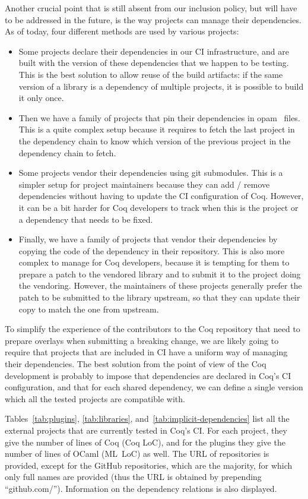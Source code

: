 Another crucial point that is still absent from our inclusion policy, but will have to be addressed in the future, is the way projects can manage their dependencies.
As of today, four different methods are used by various projects:

\begin{itemize}
	\item Some projects declare their dependencies in our CI infrastructure, and are built with the version of these dependencies that we happen to be testing. This is the best solution to allow reuse of the build artifacts: if the same version of a library is a dependency of multiple projects, it is possible to build it only once.
	\item Then we have a family of projects that pin their dependencies in opam~\cite{opam2013} files. This is a quite complex setup because it requires to fetch the last project in the dependency chain to know which version of the previous project in the dependency chain to fetch.
	\item Some projects vendor their dependencies using git submodules. This is a simpler setup for project maintainers because they can add / remove dependencies without having to update the CI configuration of Coq. However, it can be a bit harder for Coq developers to track when this is the project or a dependency that needs to be fixed.
	\item Finally, we have a family of projects that vendor their dependencies by copying the code of the dependency in their repository. This is also more complex to manage for Coq developers, because it is tempting for them to prepare a patch to the vendored library and to submit it to the project doing the vendoring. However, the maintainers of these projects generally prefer the patch to be submitted to the library upstream, so that they can update their copy to match the one from upstream.
\end{itemize}

To simplify the experience of the contributors to the Coq repository that need to prepare overlays when submitting a breaking change, we are likely going to require that projects that are included in CI have a uniform way of managing their dependencies. The best solution from the point of view of the Coq development is probably to impose that dependencies are declared in Coq's CI configuration, and that for each shared dependency, we can define a single version which all the tested projects are compatible with.

Tables~\ref{tab:plugins}, \ref{tab:libraries}, and~\ref{tab:implicit-dependencies} list all the external projects that are currently tested in Coq's CI.
For each project, they give the number of lines of Coq (Coq LoC), and for the plugins they give the number of lines of OCaml (ML LoC) as well.
The URL of repositories is provided, except for the GitHub repositories, which are the majority, for which only full names are provided (thus the URL is obtained by prepending ``github.com/'').
Information on the dependency relations is also displayed.

